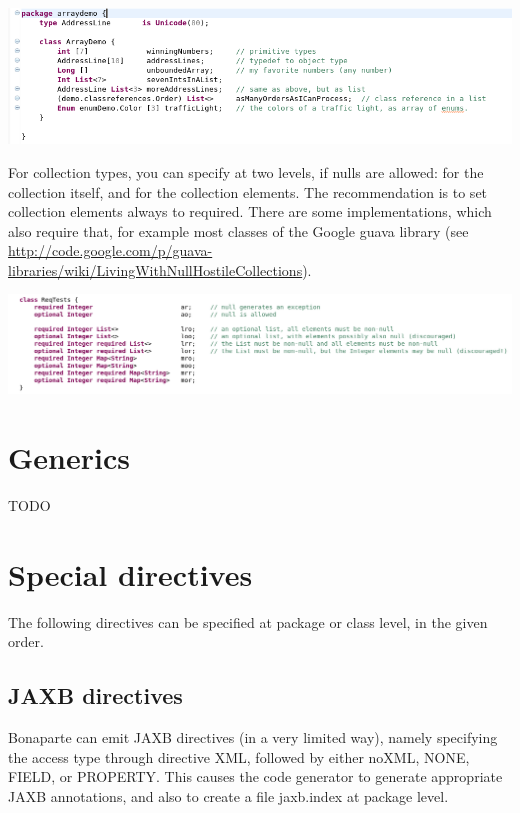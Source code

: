 \documentclass[11pt,a4paper,oneside]{article}
\begin{document}
\vspace{2mm}

\hspace{1cm}\includegraphics[scale=0.5]{images/tut1-015-arrays.png}

For collection types, you can specify at two levels, if {\ttfamily null}s are allowed: for the collection itself, and for the
collection elements.  The recommendation is to set collection elements always to {\ttfamily required}. There are some
implementations, which also require that, for example most classes of the Google {\ttfamily guava} library (see
\url{http://code.google.com/p/guava-libraries/wiki/LivingWithNullHostileCollections}).

\vspace{2mm}

\hspace{1cm}\includegraphics[scale=0.5]{images/tut1-016-collections.png}


\section{Generics}
TODO

\section{Special directives}
The following directives can be specified at package or class level, in the given order. 
\subsection{JAXB directives}
Bonaparte can emit JAXB directives (in a very limited way), namely specifying the access type through directive {\ttfamily XML}, followed
by either {\ttfamily noXML}, {\ttfamily NONE}, {\ttfamily FIELD}, or {\ttfamily PROPERTY}. This causes the code generator to generate
appropriate JAXB annotations, and also to create a file {\ttfamily jaxb.index} at package level.
 
\end{document}

